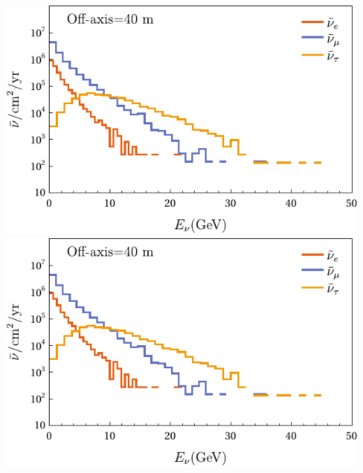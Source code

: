 \documentclass[aps,prd,twocolumn,superscriptaddress,amsmath,amssymb]{revtex4}
\newcommand{\lw}{\linewidth}
\begin{document}
\includegraphics[width=\lw]{plots/meeting/energybar-40.pdf}
\includegraphics[width=\lw]{plots/meeting/energybar-40.pdf}
\newpage
\end{document}
